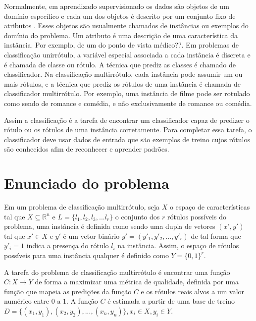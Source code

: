 Normalmente, em aprendizado supervisionado os dados são objetos de um domínio específico e cada um dos objetos
é descrito por um conjunto fixo de atributos \cite{rezende2003sistemas}. 
Esses objetos são usualmente chamados de instâncias ou exemplos do domínio do problema.
Um atributo é uma descrição de uma característica da instância.
Por exemplo, de um do ponto de vista médico??.
Em problemas de classificação unirrótulo, a variável especial associada a cada instância é discreta
e é chamada de classe ou rótulo. A técnica que prediz as classes é chamado de classificador.
Na classificação multirrótulo, cada instância pode assumir um ou mais rótulos, e a técnica
que prediz os rótulos de uma instância é chamada de classificador multirrótulo.
Por exemplo, uma instância de filme pode ser rotulado como sendo de romance e comédia, 
e não exclusivamente de romance ou comédia.

Assim a classificação é a tarefa de encontrar um classificador capaz de predizer 
o rótulo ou os rótulos de uma instância corretamente.
Para completar essa tarefa, o classificador deve usar dados de entrada que são exemplos
de treino cujos rótulos são conhecidos afim de
reconhecer e aprender padrões.

\section{Enunciado do problema}

Em um problema de classificação multirrótulo, seja $X$ o espaço de características tal que
$X\subseteq \mathbb{R}^n$ e $L=\{l_1,l_2,l_3,...l_r\}$ o conjunto dos $r$ rótulos possíveis do problema,
uma instância é definida como sendo uma dupla de vetores $(x',y')$ tal que $x'\in X$ e $y'$ é um vetor binário
$y'=(y'_1,y'_2,...,y'_r)$ de tal forma que $y'_i=1$ indica a presença do rótulo $l_i$ na instância.
Assim, o espaço de rótulos possíveis para uma instância qualquer é definido como $Y=\{0,1\}^r$.



A tarefa do problema de classificação multirrótulo é encontrar uma função $C : X \rightarrow Y$ de forma
a maximizar uma métrica de qualidade, definida por uma função que mapeia as predições da função $C$
e os rótulos reais alvos a um valor numérico entre $0$ a $1$.
A função $C$ é estimada a partir de uma base de treino $D=\{(x_1,y_1),(x_2,y_2),...,(x_n,y_n)\}, x_i\in X, y_i\in Y$.

